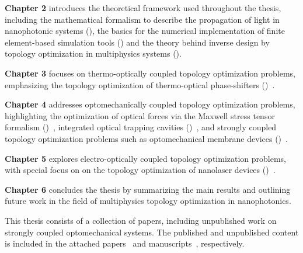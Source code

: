   \textbf{Chapter 2} introduces the theoretical framework used throughout the thesis, including the mathematical formalism
  to describe the propagation of light in nanophotonic systems (), the basics for the numerical implementation of 
  finite element-based simulation tools () and the theory behind inverse design by topology optimization in multiphysics systems ().
  
  \textbf{Chapter 3} focuses on thermo-optically coupled topology optimization problems, emphasizing the topology optimization of 
  thermo-optical phase-shifters ()~\cite{ownpub0}.
  
  \textbf{Chapter 4} addresses optomechanically coupled topology optimization problems, highlighting the optimization of optical forces via
  the Maxwell stress tensor formalism ()~\cite{ownpub2}, integrated optical trapping cavities ()~\cite{ownpub1, ownpub3}, and strongly coupled topology optimization 
  problems such as optomechanical membrane devices ()~\cite{ownpub5}.
  
  \textbf{Chapter 5} explores electro-optically coupled topology optimization problems, with special focus on on the topology optimization of 
  nanolaser devices ()~\cite{ownpub4}.
  
  \textbf{Chapter 6} concludes the thesis by summarizing the main results and outlining future work in the field of multiphysics topology optimization in nanophotonics.

This thesis consists of a collection of papers, including unpublished work on
strongly coupled optomechanical systems. The published and unpublished content is included in the attached
papers~\cite{ownpub0, ownpub1, ownpub2, ownpub3} and manuscripts~\cite{ownpub4, ownpub5}, respectively.